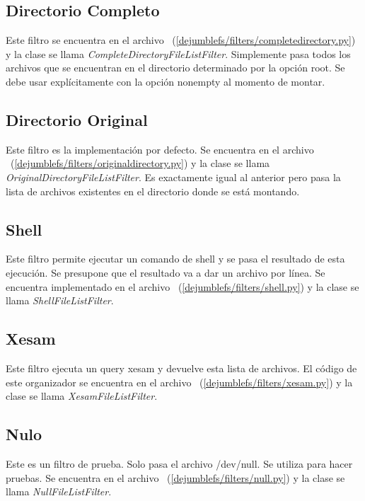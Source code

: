 \subsection{Directorio Completo}

Este filtro se encuentra en el archivo ~(\ref{dejumblefs/filters/completedirectory.py}) y la clase se llama \textit{CompleteDirectoryFileListFilter}. Simplemente pasa todos los archivos que se encuentran en el directorio determinado por la opción root. Se debe usar explícitamente con la opción nonempty al momento de montar.

\subsection{Directorio Original}

Este filtro es la implementación por defecto. Se encuentra en el archivo ~(\ref{dejumblefs/filters/originaldirectory.py}) y la clase se llama \textit{OriginalDirectoryFileListFilter}. Es exactamente igual al anterior pero pasa la lista de archivos existentes en el directorio donde se está montando.

\subsection{Shell}

Este filtro permite ejecutar un comando de shell y se pasa el resultado de esta ejecución. Se presupone que el resultado va a dar un archivo por línea. Se encuentra implementado en el archivo ~(\ref{dejumblefs/filters/shell.py}) y la clase se llama \textit{ShellFileListFilter}.

\subsection{Xesam}

Este filtro ejecuta un query xesam y devuelve esta lista de archivos. El código de este organizador se encuentra en el archivo ~(\ref{dejumblefs/filters/xesam.py}) y la clase se llama \textit{XesamFileListFilter}.

\subsection{Nulo}

Este es un filtro de prueba. Solo pasa el archivo /dev/null. Se utiliza para hacer pruebas. Se encuentra en el archivo ~(\ref{dejumblefs/filters/null.py}) y la clase se llama \textit{NullFileListFilter}.


